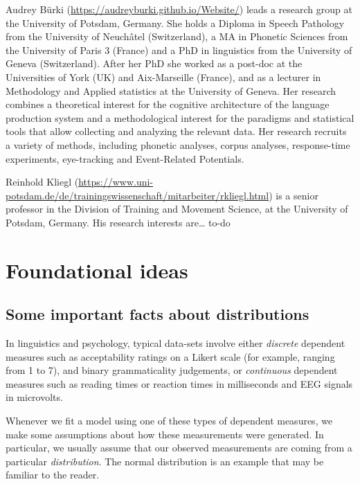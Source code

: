 \documentclass[
  12pt,
]{krantz}
\theoremstyle{definition}
\theoremstyle{definition}
\theoremstyle{definition}
\theoremstyle{definition}
\theoremstyle{remark}
\begin{document}
Audrey Bürki (\url{https://audreyburki.github.io/Website/}) leads a research group at the University of Potsdam, Germany. She holds a Diploma in Speech Pathology from the University of Neuchâtel (Switzerland), a MA in Phonetic Sciences from the University of Paris 3 (France) and a PhD in linguistics from the University of Geneva (Switzerland). After her PhD she worked as a post-doc at the Universities of York (UK) and Aix-Marseille (France), and as a lecturer in Methodology and Applied statistics at the University of Geneva. Her research combines a theoretical interest for the cognitive architecture of the language production system and a methodological interest for the paradigms and statistical tools that allow collecting and analyzing the relevant data. Her research recruits a variety of methods, including phonetic analyses, corpus analyses, response-time experiments, eye-tracking and Event-Related Potentials.

Reinhold Kliegl (\url{https://www.uni-potsdam.de/de/trainingswissenschaft/mitarbeiter/rkliegl.html}) is a senior professor in the Division of Training and Movement Science, at the University of Potsdam, Germany. His research interests are\ldots{} to-do

\mainmatter

\hypertarget{part-foundational-ideas}{%
\part{Foundational ideas}\label{part-foundational-ideas}}

\hypertarget{some-important-facts-about-distributions}{%
\chapter{Some important facts about distributions}\label{some-important-facts-about-distributions}}

In linguistics and psychology, typical data-sets involve either \emph{discrete} dependent measures such as acceptability ratings on a Likert scale (for example, ranging from 1 to 7), and binary grammaticality judgements, or \emph{continuous} dependent measures such as reading times or reaction times in milliseconds and EEG signals in microvolts.

Whenever we fit a model using one of these types of dependent measures, we make some assumptions about how these measurements were generated. In particular, we usually assume that our observed measurements are coming from a particular \emph{distribution}. The normal distribution is an example that may be familiar to the reader.
\end{document}
